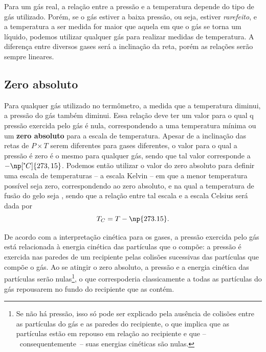 Para um gás real, a relação entre a pressão e a temperatura depende do tipo de gás utilizado. Porém, se o gás estiver a baixa pressão, ou seja, estiver \emph{rarefeito}, e a temperatura a ser medida for maior que aquela em que o gás se torna um líquido, podemos utilizar qualquer gás para realizar medidas de temperatura. A diferença entre diversos gases será a inclinação da reta, porém as relações serão sempre lineares.

\subsection{Zero absoluto}

Para qualquer gás utilizado no termômetro, a medida que a temperatura diminui, a pressão do gás também diminui. Essa relação deve ter um valor para o qual q pressão exercida pelo gás é nula, correspondendo a uma temperatura mínima ou um \textbf{zero absoluto} para a escala de temperatura. Apesar de a inclinação das retas de $P \times T$ serem diferentes para gases diferentes, o valor para o qual a pressão é zero é o mesmo para qualquer gás, sendo que tal valor corresponde a $-\np[\tcdegree C]{273,15}$. Podemos então utilizar o valor do zero absoluto para definir uma escala de temperaturas -- a escala Kelvin -- em que a menor temperatura possível seja zero, correspondendo ao zero absoluto, e na qual a temperatura de fusão do gelo seja , sendo que a relação entre tal escala e a escala Celsius será dada por
\begin{equation}\label{Eq:RelKC}
	T_C = T - \np{273.15}.
\end{equation}

De acordo com a interpretação cinética para os gases, a pressão exercida pelo gás está relacionada à energia cinética das partículas que o compõe: a pressão é exercida nas paredes de um recipiente pelas colisões sucessivas das partículas que compõe o gás. Ao se atingir o zero absoluto, a pressão e a energia cinética das partículas serão nulas\footnote{Se não há pressão, isso só pode ser explicado pela ausência de colisões entre as partículas do gás e as paredes do recipiente, o que implica que as partículas estão em repouso em relação ao recipiente e que --~consequentemente~-- suas energias cinéticas são nulas.}, o que correspoderia classicamente a todas as partículas do gás repousarem no fundo do recipiente que as contém.

